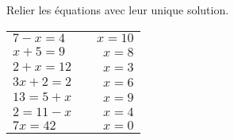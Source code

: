 \documentclass["../Cours.tex"]{subfiles}
\begin{document}
\clearpage
\EXERCICES
\begin{questions}
    \exercice 
    \question Relier les équations avec leur unique solution.
    \begin{center}
    \begin{tabularx}{0.5\linewidth}{lXr}
        $7-x=4$ && $x=10$ \\
        $x+5=9$ && $x=8$ \\ 
        $2+x=12$ && $x=3$ \\
        $3x+2=2$ && $x=6$ \\
        $13=5+x$ && $x=9$ \\
        $2=11-x$ && $x=4$ \\
        $7x=42$ && $x=0$
    \end{tabularx}
    \end{center}


\end{questions}
\end{document}
